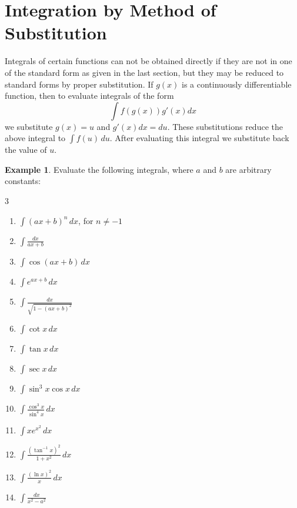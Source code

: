 \documentclass{book}
\theoremstyle{definition}
\newtheorem{example}{Example}[section]
\begin{document}
\section{Integration by Method of Substitution}

Integrals of certain functions can not be obtained directly if they are not in one of the standard form as given in the last section, but they may be reduced to standard forms by proper substitution. If $g(x)$ is a continuously differentiable function, then to evaluate integrals of the form
\[
\displaystyle\int f(g(x))g'(x)dx
\]
we substitute $g(x)=u$ and $g'(x)dx=du$. These substitutions reduce the above integral to $\displaystyle\int f(u) \, du$. After evaluating this integral we substitute back the value of $u$.
\newpage
\begin{example}
Evaluate the following integrals, where $a$ and $b$ are arbitrary constants:
\begin{multicols}{3}

\begin{enumerate}[label=(\roman*)]
    \item $\displaystyle\int (ax+b)^n \, dx$, for $n\neq -1$
    \item $\displaystyle\int \frac{dx}{ax+b}$
    \item $\displaystyle\int\cos (ax+b) \, dx$
    \item $\displaystyle\int e^{ax+b} \, dx$
    \item $\displaystyle\int\frac{dx}{\sqrt{1-(ax+b)^2}}$
    \item $\displaystyle\int\cot x \, dx$
    \item $\displaystyle\int\tan x \, dx$
    \item $\displaystyle\int\sec x \, dx$
    \item $\displaystyle\int \sin^3 x\cos x \, dx$
    \item $\displaystyle\int\frac{\cos^3x}{\sin^4x}\,dx$
    \item $\displaystyle\int xe^{x^2} \, dx$
    \item $\displaystyle\int \frac{(\tan^{-1}x)^2}{1+x^2} \, dx$
    \item $\displaystyle\int\frac{(\ln x)^2}{x} \, dx$
    \item $\displaystyle\int\frac{dx}{x^2-a^2}$
\end{enumerate}
\end{multicols}    
\end{example}
\end{document}
